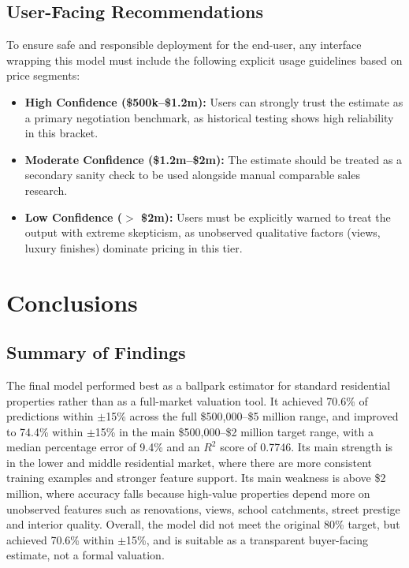 \documentclass[a4paper,12pt]{article}
\begin{document}
\subsection{User-Facing Recommendations}
To ensure safe and responsible deployment for the end-user, any interface wrapping this model must include the following explicit usage guidelines based on price segments:
\begin{itemize}
    \item \textbf{High Confidence (\$500k--\$1.2m):} Users can strongly trust the estimate as a primary negotiation benchmark, as historical testing shows high reliability in this bracket.
    \item \textbf{Moderate Confidence (\$1.2m--\$2m):} The estimate should be treated as a secondary sanity check to be used alongside manual comparable sales research.
    \item \textbf{Low Confidence ($>$ \$2m):} Users must be explicitly warned to treat the output with extreme skepticism, as unobserved qualitative factors (views, luxury finishes) dominate pricing in this tier.
\end{itemize}

\section{Conclusions}

\subsection{Summary of Findings}

The final model performed best as a ballpark estimator for standard residential properties rather than as a full-market valuation tool. It achieved 70.6\% of predictions within $\pm$15\% across the full \$500,000--\$5 million range, and improved to 74.4\% within $\pm$15\% in the main \$500,000--\$2 million target range, with a median percentage error of 9.4\% and an $R^2$ score of 0.7746. Its main strength is in the lower and middle residential market, where there are more consistent training examples and stronger feature support. Its main weakness is above \$2 million, where accuracy falls because high-value properties depend more on unobserved features such as renovations, views, school catchments, street prestige and interior quality. Overall, the model did not meet the original 80\% target, but achieved 70.6\% within $\pm$15\%, and is suitable as a transparent buyer-facing estimate, not a formal valuation.
\end{document}
